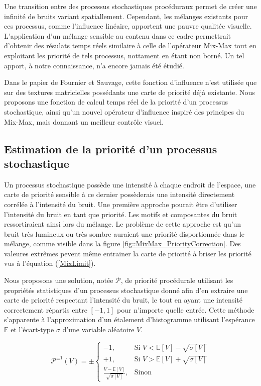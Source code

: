 \documentclass[9pt, twocolumn]{article} %
\begin{document}
Une transition entre des processus stochastiques procéduraux permet de créer
une infinité de bruits variant spatiallement. Cependant, les mélanges existants
pour ces processus, comme l'influence linéaire, apportent une pauvre qualitée
visuelle. L'application d'un mélange sensible au contenu dans ce cadre
permettrait d'obtenir des résulats temps réels similaire à celle de l'opérateur
Mix-Max tout en exploitant les priorité de tels processus, nottament en étant
non borné. Un tel apport, à notre connaissance, n'a encore jamais été étudié.

Dans le papier de Fournier et Sauvage, cette fonction d'influence n'est
utilisée que sur des textures matricielles possédants une carte de priorité
déjà existante. Nous proposons une fonction de calcul temps réel de la priorité
d'un processus stochastique, ainsi qu'un nouvel opérateur d'influence inspiré
des principes du Mix-Max, mais donnant un meilleur contrôle visuel.

\subsection{Estimation de la priorité d'un processus stochastique}

Un processus stochastique possède une intensité à chaque endroit de l'espace,
une carte de priorité sensible à ce dernier possèderais une intensité
directement corrélée à l'intensité du bruit. Une première approche pourait être
d'utiliser l'intensité du bruit en tant que priorité. Les motifs et composantes
du bruit ressortiraient ainsi lors du mélange. Le problème de cette approche
est qu'un bruit très lumineux ou très sombre auraient une priorité
disportionnée dans le mélange, comme visible dans la figure
\ref{fig::MixMax_PriorityCorrection}. Des valeures extrêmes pevent même
entrainer la carte de priorité à briser les priorité vus à l'équation
(\ref{MixLimit}).

Nous proposons une solution, notée $\mathcal{P}$, de priorité procédurale
utilisant les propriétés statistiques d'un processus stochastique donné afin
d'en extraire une carte de priorité respectant l'intensité du bruit, le tout en
ayant une intensité correctement répartis entre $[-1, 1]$ pour n'importe quelle
entrée. Cette méthode s'apparente à l'approximation d'un étalement
d'histogramme utilisant l'espérance $\mathbb{E}$ et l'écart-type $\sigma$ d'une
variable aléatoire $V$.

\begin{equation}\label{ProceduralPriorityFormula}
  \mathcal P^{\pm 1}(V) =
  \pm
  \begin{cases}
    -1,                                         & \text{Si } V < \mathbb{E}[V]- \sqrt{\sigma[V]} \\
    +1,                                         & \text{Si } V > \mathbb{E}[V]+ \sqrt{\sigma[V]} \\
    \frac{V - \mathbb{E}[V]}{\sqrt{\sigma[V]}}, & \text{Sinon}
  \end{cases}
\end{equation}
\end{document}
